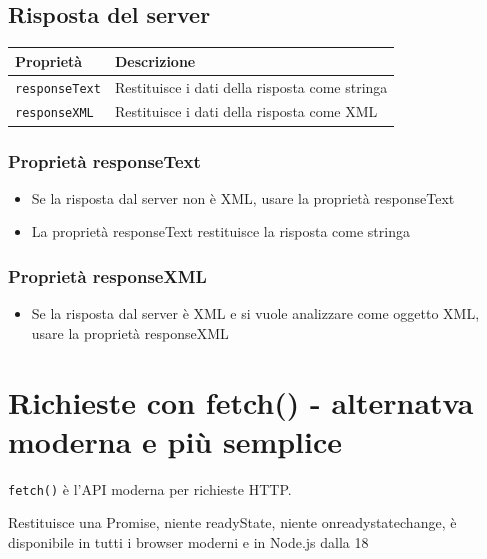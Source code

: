 \subsection{Risposta del server}
\begin{tabularx}{\linewidth}{|l|X|}
    \hline
    \textbf{Proprietà} & \textbf{Descrizione} \\
    \hline
    \texttt{responseText} & Restituisce i dati della risposta come stringa \\
    \hline
    \texttt{responseXML} &  Restituisce i dati della risposta come XML \\
    \hline
\end{tabularx}

\subsubsection{Proprietà responseText}
\begin{itemize}
    \item Se la risposta dal server non è XML, usare la proprietà responseText
    \item La proprietà responseText restituisce la risposta come stringa
\end{itemize}

\subsubsection{Proprietà responseXML}
\begin{itemize}
    \item Se la risposta dal server è XML e si vuole analizzare come oggetto XML, usare la proprietà responseXML
\end{itemize}

\section{Richieste con fetch() - alternatva moderna e più semplice}
\texttt{fetch()} è l'API moderna per richieste HTTP.

Restituisce una Promise, niente readyState, niente onreadystatechange, è disponibile in tutti i browser moderni e in Node.js dalla 18

